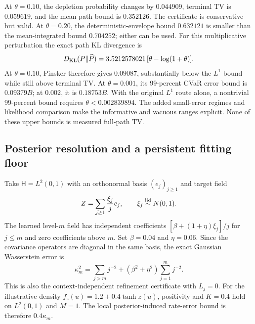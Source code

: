 \begin{table}[htbp]
 \centering\small
 
 \caption{Exact finite-state calculations up to matrix-exponential precision. Depletion bias and terminal TV are measured distributional errors. The $L^1$ and KL columns are full-path TV upper bounds. The final column bounds the absolute CVaR difference divided by cost range $B$, using the smallest available path bound.}
 \label{tab:queue}
\end{table}

At $\theta=0.10$, the depletion probability changes by $0.044909$, terminal TV is $0.059619$, and the mean path bound is $0.352126$. The certificate is conservative but valid. At $\theta=0.20$, the deterministic-envelope bound $0.632121$ is smaller than the mean-integrated bound $0.704252$; either can be used.
For this multiplicative perturbation the exact path KL divergence is
\[
 D_{\rm KL}(P\|\widehat P)=3.5212578021\,[\theta-\log(1+\theta)].
\]
At $\theta=0.10$, Pinsker therefore gives $0.09087$, substantially below the $L^1$ bound while still above terminal TV. At $\theta=0.001$, its 99-percent CVaR error bound is $0.09379B$; at $0.002$, it is $0.18753B$. With the original $L^1$ route alone, a nontrivial 99-percent bound requires $\theta<0.002839894$. The added small-error regimes and likelihood comparison make the informative and vacuous ranges explicit. None of these upper bounds is measured full-path TV.

\subsection{Posterior resolution and a persistent fitting floor}
Take $\mathsf H=L^2(0,1)$ with an orthonormal basis $(e_j)_{j\ge1}$ and target field
\[
 Z=\sum_{j\ge1}\frac{\xi_j}{j}e_j,\qquad \xi_j\stackrel{\rm iid}{\sim}N(0,1).
\]
The learned level-$m$ field has independent coefficients
$[\beta+(1+\eta)\xi_j]/j$ for $j\le m$ and zero coefficients above $m$.
Set $\beta=0.04$ and $\eta=0.06$. Since the covariance operators are diagonal in the same basis, the exact Gaussian Wasserstein error is
\begin{equation}\label{eq:gaussian-posterior}
 \kappa_m^2=\sum_{j>m}j^{-2}
 +(\beta^2+\eta^2)\sum_{j=1}^mj^{-2}.
\end{equation}
This is also the context-independent refinement certificate with $L_j=0$.
For the illustrative density $f_z(u)=1.2+0.4\tanh z(u)$, positivity and
$K=0.4$ hold on $L^2(0,1)$ and $M=1$.
The local posterior-induced rate-error bound is therefore $0.4\kappa_m$.

